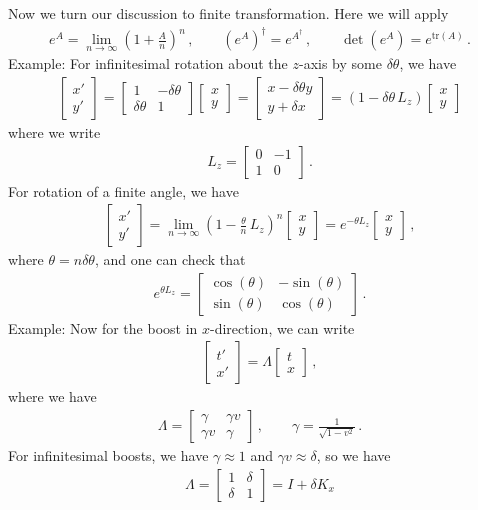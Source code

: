 \documentclass[11pt, onesided]{book}
\theoremstyle{break}
\theoremstyle{break}
\newcommand{\bmat}[1]{\begin{bmatrix} #1 \end{bmatrix}}
\newcommand{\example}{\color{green}Example: \color{black}}
\begin{document}
Now we turn our discussion to finite transformation. Here we will apply
\begin{align*}
e^A = \lim_{n \to \infty} \left( 1+ \frac{A}{n}\right)^n\,, \qquad (e^A)^\dagger = e^{A^\dagger}\,, \qquad \det(e^A) = e^{\text{tr}(A)}\,.
\end{align*}
\example For infinitesimal rotation about the $z$-axis by some $\delta \theta$, we have
\begin{align*}
\bmat{x' \\ y'} = \bmat{1 & -\delta\theta \\ \delta\theta & 1}\bmat{x \\y}
=\bmat{x- \delta \theta y  \\ y + \delta x} = ( 1- \delta\theta\, L_z) \bmat{x \\ y}
\end{align*}
where we write
\begin{align*}
L_z = \bmat{0 & -1 \\ 1 & 0}\,.
\end{align*}
For rotation of a finite angle, we have
\begin{align*}
\bmat{x' \\ y'} = \lim_{n\to \infty} \left( 1- \frac{\theta}{n}\,L_z \right)^n\bmat{x \\y} = e^{-\theta L_z} \bmat{x \\ y}\,,
\end{align*}
where $\theta = n\delta \theta$, and one can check that 
\begin{align*}
e^{\theta L_z} = \bmat{\cos(\theta)& -\sin(\theta) \\
\sin(\theta) & \cos(\theta)}\,.
\end{align*}
\example Now for the boost in $x$-direction, we can write
\begin{align*}
\bmat{t' \\ x'} = \Lambda \bmat{t\\ x}\,,
\end{align*}
where we have
\begin{align*}
\Lambda = \bmat{\gamma & \gamma v \\ \gamma v & \gamma}\,, \qquad \gamma = \frac{1}{\sqrt{1- v^2}}\,.
\end{align*}
For infinitesimal boosts, we have $\gamma \approx 1$ and $\gamma v \approx \delta$, so we have
\begin{align*}
\Lambda = \bmat{1 & \delta  \\ \delta &1} = I+ \delta K_x
\end{align*}
\end{document}
